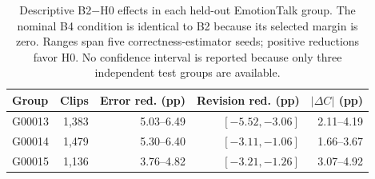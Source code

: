\begin{table}[t]
\centering
\caption{Descriptive B2$-$H0 effects in each held-out EmotionTalk group. The nominal B4 condition is identical to B2 because its selected margin is zero. Ranges span five correctness-estimator seeds; positive reductions favor H0. No confidence interval is reported because only three independent test groups are available.}
\label{tab:external-groups}
\scriptsize
\begin{tabular}{lrrrr}
\toprule
Group & Clips & Error red. (pp) & Revision red. (pp) & $|\Delta C|$ (pp) \\
\midrule
G00013 & 1,383 & 5.03--6.49 & $[-5.52,-3.06]$ & 2.11--4.19 \\
G00014 & 1,479 & 5.30--6.40 & $[-3.11,-1.06]$ & 1.66--3.67 \\
G00015 & 1,136 & 3.76--4.82 & $[-3.21,-1.26]$ & 3.07--4.92 \\
\bottomrule
\end{tabular}
\end{table}
